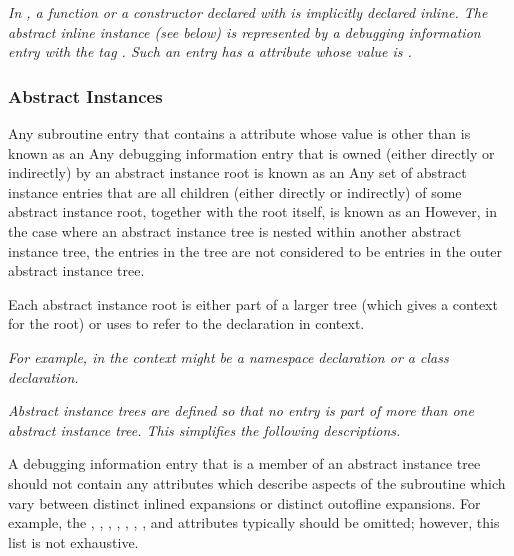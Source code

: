 \textit{In , a function or a constructor declared with
 is implicitly declared inline. The abstract inline
instance (see below) is represented by a debugging information
entry with the tag \DWTAGsubprogram. Such an entry has a
\DWATinline{} attribute whose value is \DWINLinlined.}

\subsubsection{Abstract Instances}
\label{chap:abstractinstances}
Any subroutine entry that contains a
\DWATinlineDEFN{} attribute 
whose value is other than 
\DWINLnotinlined{}
is known as an
\hypertarget{chap:DWATinlineabstracttinstance}{}
Any debugging information entry that is owned (either
directly or indirectly) by an abstract instance root
is known as an
Any set of abstract instance entries that are all
children (either directly or indirectly) of some abstract
instance root, together with the root itself, is known as an
However, in the case where an abstract instance tree is 
nested within another abstract instance tree, the entries in the 
tree are not considered to be entries in the outer abstract
instance tree.

Each abstract instance root is either part of a larger
tree (which gives a context for the root) or 
uses
\DWATspecification{} 
to refer to the declaration in context.

\textit{For example, in  the context might be a namespace
declaration or a class declaration.}

\textit{Abstract instance trees are defined so that no entry is part
of more than one abstract instance tree. This simplifies the
following descriptions.}

A debugging information entry that is a member of an abstract
instance tree should not contain any attributes which describe
aspects of the subroutine which vary between distinct inlined
expansions or distinct out\dash of\dash line expansions. For example,
the \DWATlowpc,
\DWAThighpc, 
\DWATranges, 
\DWATentrypc, 
\DWATlocation,
\DWATreturnaddr, 
\DWATstartscope, 
and 
\DWATsegment{}
attributes 
typically 
should 
be 
omitted; 
however, 
this 
list
is not exhaustive.

